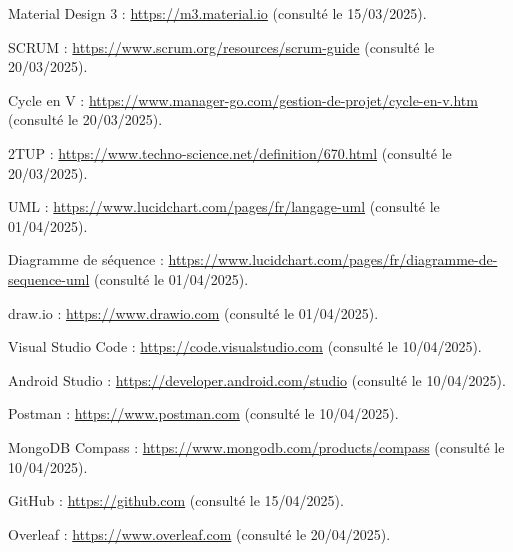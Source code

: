 \documentclass[12pt,a4paper]{report}
\begin{document}
\begin{enumerate}[label={[\arabic*]}, leftmargin=1.5cm]
		\item Material Design 3 : \url{https://m3.material.io} (consulté le 15/03/2025).
		
		\item SCRUM : \url{https://www.scrum.org/resources/scrum-guide} (consulté le 20/03/2025).
		
		\item Cycle en V : \url{https://www.manager-go.com/gestion-de-projet/cycle-en-v.htm} (consulté le 20/03/2025).
		
		\item 2TUP : \url{https://www.techno-science.net/definition/670.html} (consulté le 20/03/2025).
		
		\item UML : \url{https://www.lucidchart.com/pages/fr/langage-uml} (consulté le 01/04/2025).
		
		\item Diagramme de séquence : \url{https://www.lucidchart.com/pages/fr/diagramme-de-sequence-uml} (consulté le 01/04/2025).
		
		\item draw.io : \url{https://www.drawio.com} (consulté le 01/04/2025).
		
		\item Visual Studio Code : \url{https://code.visualstudio.com} (consulté le 10/04/2025).
		
		\item Android Studio : \url{https://developer.android.com/studio} (consulté le 10/04/2025).
		
		\item Postman : \url{https://www.postman.com} (consulté le 10/04/2025).
		
		\item MongoDB Compass : \url{https://www.mongodb.com/products/compass} (consulté le 10/04/2025).
		
		\item GitHub : \url{https://github.com} (consulté le 15/04/2025).
		
		\item Overleaf : \url{https://www.overleaf.com} (consulté le 20/04/2025).
		
	\end{enumerate}
\newpage
\thispagestyle{fancy}
\end{document}
